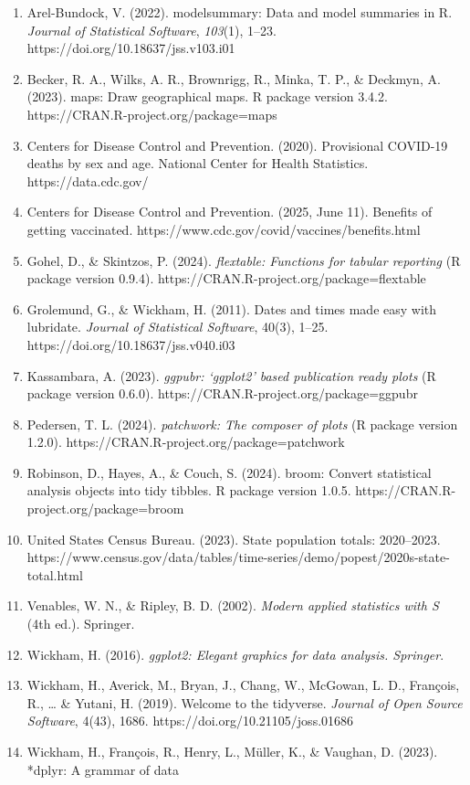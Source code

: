 \documentclass[
]{article}
\begin{document}
\vspace{0.5em}

\begin{enumerate}
\def\labelenumi{\arabic{enumi}.}
\item
  Arel-Bundock, V. (2022). modelsummary: Data and model summaries in R.
  \emph{Journal of Statistical Software}, \emph{103}(1), 1--23.
  https://doi.org/10.18637/jss.v103.i01
\item
  Becker, R. A., Wilks, A. R., Brownrigg, R., Minka, T. P., \& Deckmyn,
  A. (2023). maps: Draw geographical maps. R package version 3.4.2.
  https://CRAN.R-project.org/package=maps
\item
  Centers for Disease Control and Prevention. (2020). Provisional
  COVID-19 deaths by sex and age. National Center for Health Statistics.
  https://data.cdc.gov/
\item
  Centers for Disease Control and Prevention. (2025, June 11). Benefits
  of getting vaccinated.
  https://www.cdc.gov/covid/vaccines/benefits.html
\item
  Gohel, D., \& Skintzos, P. (2024). \emph{flextable: Functions for
  tabular reporting} (R package version 0.9.4).
  https://CRAN.R-project.org/package=flextable
\item
  Grolemund, G., \& Wickham, H. (2011). Dates and times made easy with
  lubridate. \emph{Journal of Statistical Software}, 40(3), 1--25.
  https://doi.org/10.18637/jss.v040.i03
\item
  Kassambara, A. (2023). \emph{ggpubr: `ggplot2' based publication ready
  plots} (R package version 0.6.0).
  https://CRAN.R-project.org/package=ggpubr
\item
  Pedersen, T. L. (2024). \emph{patchwork: The composer of plots} (R
  package version 1.2.0). https://CRAN.R-project.org/package=patchwork
\item
  Robinson, D., Hayes, A., \& Couch, S. (2024). broom: Convert
  statistical analysis objects into tidy tibbles. R package version
  1.0.5. https://CRAN.R-project.org/package=broom
\item
  United States Census Bureau. (2023). State population totals:
  2020--2023.
  https://www.census.gov/data/tables/time-series/demo/popest/2020s-state-total.html
\item
  Venables, W. N., \& Ripley, B. D. (2002). \emph{Modern applied
  statistics with S} (4th ed.). Springer.
\item
  Wickham, H. (2016). \emph{ggplot2: Elegant graphics for data analysis.
  Springer}.
\item
  Wickham, H., Averick, M., Bryan, J., Chang, W., McGowan, L. D.,
  François, R., \ldots{} \& Yutani, H. (2019). Welcome to the tidyverse.
  \emph{Journal of Open Source Software}, 4(43), 1686.
  https://doi.org/10.21105/joss.01686
\item
  Wickham, H., François, R., Henry, L., Müller, K., \& Vaughan, D.
  (2023). *dplyr: A grammar of data
\end{enumerate}
\end{document}

